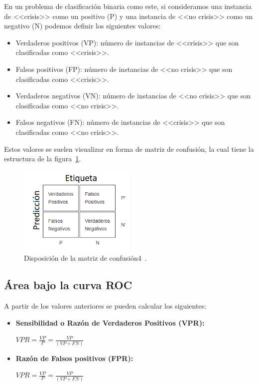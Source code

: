 En un problema de clasificación binaria como este, si consideramos una instancia de <<crisis>> como un positivo (P) y una instancia de <<no crisis>> como un negativo (N) podemos definir los siguientes valores: 

\begin{itemize}
	\item Verdaderos positivos (VP): número de instancias de <<crisis>> que son clasificadas como <<crisis>>. 
	\item Falsos positivos (FP): número de instancias de <<no crisis>> que son clasificadas como <<crisis>>. 
	\item Verdaderos negativos (VN): número de instancias de <<no crisis>> que son clasificadas como <<no crisis>>. 
	\item Falsos negativos (FN): número de instancias de <<crisis>> que son clasificadas como <<no crisis>>.  
\end{itemize}

Estos valores se suelen visualizar en forma de matriz de confusión, la cual tiene la estructura de la figura~\ref{fig:matrizconfusion}.

\begin{figure}[H]
	\centering
	\includegraphics[width=0.5\textwidth]{../img/matrizconfusion.png}
	\caption{Disposición de la matriz de confusión4~\cite{wiki:roc}.}
	\label{fig:matrizconfusion}
\end{figure}  

\subsection{Área bajo la curva ROC}

A partir de los valores anteriores se pueden calcular los siguientes: 

\begin{itemize}
	\item \textbf{Sensibilidad o Razón de Verdaderos Positivos (VPR):}
	\begin{center}
		$VPR=\frac{VP}{P}=\frac{VP}{(VP+FN)}$ 
	\end{center} 
	\item \textbf{Razón de Falsos positivos (FPR):} 
	\begin{center}
		$VPR=\frac{VP}{P}=\frac{VP}{(VP+FN)}$ 
	\end{center} 
\end{itemize}

